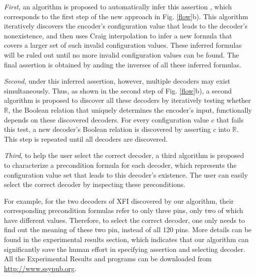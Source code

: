 \documentclass[journal]{IEEEtran}
\begin{document}
\emph{First},
an algorithm is proposed to automatically infer this assertion \cite{ShengYuShen:iccad11},
which corresponds to the first step of the new approach in Fig. \ref{flow}b).
This algorithm iteratively discovers the encoder's configuration value that leads to the decoder's nonexistence,
and then uses Craig interpolation to infer a new formula that covers a larger set of such invalid configuration values.
These inferred formulas will be ruled out until no more invalid configuration values can be found.
The final assertion is obtained by anding the inverses of all these inferred formulas.

\emph{Second},
under this inferred assertion,
however,
multiple decoders may exist simultaneously.
Thus,
as shown in the second step of Fig. \ref{flow}b),
a second algorithm is proposed to discover all these decoders by iteratively testing whether $\mathbb{R}$,
the Boolean relation that uniquely determines the encoder's input,
functionally depends\cite{funcdep} on these discovered decoders.
For every configuration value $c$ that fails this test,
a new decoder's Boolean relation is discovered by asserting $c$ into $\mathbb{R}$.
This step is repeated until all decoders are discovered.

\emph{Third},
to help the user select the correct decoder,
a third algorithm is proposed to characterize a precondition formula for each decoder,
which represents the configuration value set that leads to this decoder's existence.
The user can easily select the correct decoder by inspecting these preconditions.
% 

For example,
for the two decoders of XFI discovered by our algorithm,
their corresponding precondition formulas refer to only three pins,
only two of which have different values.
Therefore,
to select the correct decoder,
one only needs to find out the meaning of these two pin,
instead of all 120 pins.
More details can be found in the experimental results section,
which indicates that our algorithm can significantly save the human effort in specifying assertion and selecting decoder.
All the Experimental Results and programs can be downloaded from \url{http://www.ssypub.org}.
\end{document}
